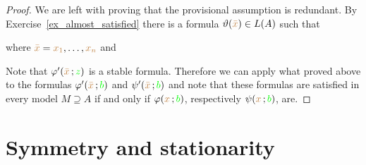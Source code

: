 \begin{proof}
  We are left with proving that the provisional assumption is redundant.
  By Exercise~\ref{ex_almost_satisfied} there is a formula $\vartheta({\color{brown}\bar x})\in L(A)$ such that


  where ${\color{brown}\bar x}={\color{brown} x_1},\dots,{\color{brown} x_n}$ and 



  Note that $\varphi'({\color{brown}\bar x}\,;{\color{green} z})$ is a stable formula.
  Therefore we can apply what proved above to the formulas $\varphi'({\color{brown}\bar x}\,;{\color{green} b})$ and $\psi'({\color{brown}\bar x}\,;{\color{green} b})$ and note that these formulas are satisfied in every model $M\supseteq A$ if and only if $\varphi({\color{brown} x}\,;{\color{green} b})$, respectively $\psi({\color{brown} x}\,;{\color{green} b})$, are.
\end{proof}



\section{Symmetry and stationarity}
\label{stationarity}

